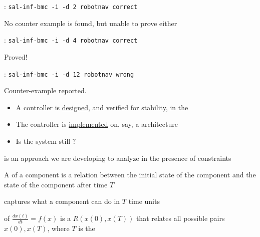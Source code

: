 \documentclass{seminar}
\begin{document}
\begin{slide}

{}: {\tt{sal-inf-bmc -i -d 2 robotnav correct}}

No counter example is found, but unable to prove either

\bigskip

{}: {\tt{sal-inf-bmc -i -d 4 robotnav correct}}

Proved!

\bigskip

{}: {\tt{sal-inf-bmc -i -d 12 robotnav wrong}}

Counter-example reported.


\end{slide}
\begin{slide}

{} 
\begin{itemize}
\item
A controller is {\underline{designed}}, and verified for stability, 
in the {}
\item
The controller is {\underline{implemented}} on, say, a
{} architecture
\item
Is the system still {}?
\end{itemize}

\bigskip
{} is an approach we are developing
to analyze {} in the presence of {} constraints

\end{slide}
\begin{slide}

{} 

\bigskip

A {} of a component
is a relation between the initial state of the component
and the state of the component after time $T$

\medskip

{} captures what a
component can do in $T$ time units

\medskip

{} of $\frac{dx(t)}{dt} = f(x)$ is a {}
$R(x(0),x(T))$ that relates all possible pairs
$x(0),x(T)$, where $T$ is the {}

\end{slide}
\end{document}
